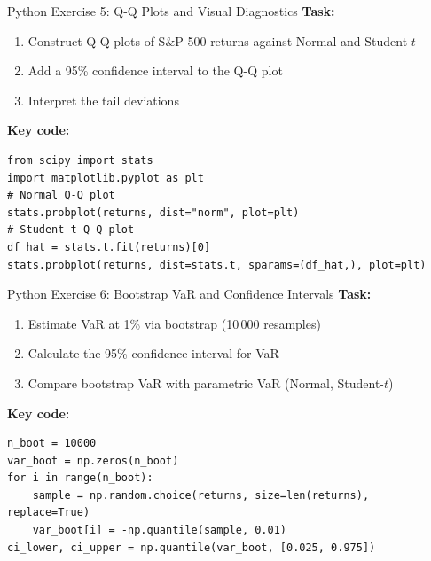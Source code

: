 \documentclass[9pt, aspectratio=169, t]{beamer}
\begin{document}
\begin{frame}[fragile]{Python Exercise 5: Q-Q Plots and Visual Diagnostics}
    \textbf{Task:}
    \begin{enumerate}\setlength{\itemsep}{0pt}
        \item Construct Q-Q plots of S\&P 500 returns against Normal and Student-$t$
        \item Add a 95\% confidence interval to the Q-Q plot
        \item Interpret the tail deviations
    \end{enumerate}

    \vspace{0.3cm}
    \textbf{Key code:}
    \begin{verbatim}
from scipy import stats
import matplotlib.pyplot as plt
# Normal Q-Q plot
stats.probplot(returns, dist="norm", plot=plt)
# Student-t Q-Q plot
df_hat = stats.t.fit(returns)[0]
stats.probplot(returns, dist=stats.t, sparams=(df_hat,), plot=plt)
    \end{verbatim}

\end{frame}

\begin{frame}[fragile]{Python Exercise 6: Bootstrap VaR and Confidence Intervals}
    \textbf{Task:}
    \begin{enumerate}\setlength{\itemsep}{0pt}
        \item Estimate VaR at 1\% via bootstrap (10\,000 resamples)
        \item Calculate the 95\% confidence interval for VaR
        \item Compare bootstrap VaR with parametric VaR (Normal, Student-$t$)
    \end{enumerate}

    \vspace{0.3cm}
    \textbf{Key code:}
    \begin{verbatim}
n_boot = 10000
var_boot = np.zeros(n_boot)
for i in range(n_boot):
    sample = np.random.choice(returns, size=len(returns), replace=True)
    var_boot[i] = -np.quantile(sample, 0.01)
ci_lower, ci_upper = np.quantile(var_boot, [0.025, 0.975])
    \end{verbatim}

\end{frame}
\end{document}
